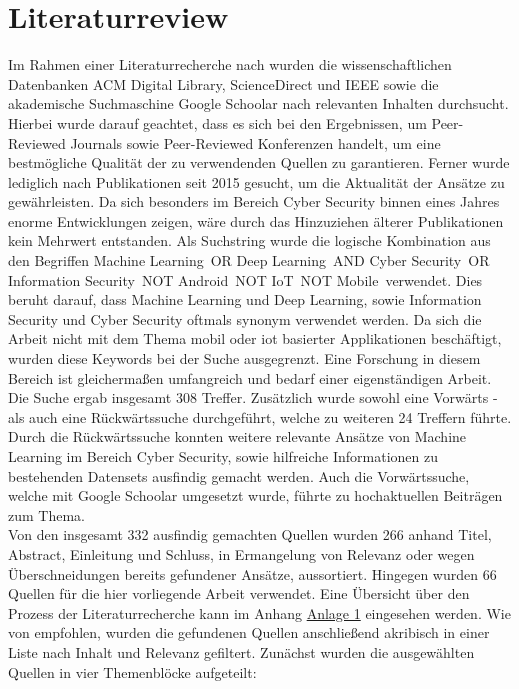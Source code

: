 \documentclass[
    12pt, %
    DIV10,
    ngerman, %
    a4paper, %
    oneside, %
    titlepage, %
    parskip=half, %
    headings=normal, %
    listof=totoc, %
    bibliography=totoc, %
    index=totoc, %
    captions=tableheading, %
    final %
]{scrreprt}
\begin{document}
\section{Literaturreview}
\label{sec:lr}
Im Rahmen einer Literaturrecherche nach \textcite{Webster2002} wurden die wissenschaftlichen Datenbanken ACM Digital Library, ScienceDirect und IEEE sowie die akademische Suchmaschine Google Schoolar nach relevanten Inhalten durchsucht. Hierbei wurde darauf geachtet, dass es sich bei den Ergebnissen, um Peer-Reviewed Journals sowie Peer-Reviewed Konferenzen handelt, um eine bestmögliche Qualität der zu verwendenden Quellen zu garantieren. Ferner wurde lediglich nach Publikationen seit 2015 gesucht, um die Aktualität der Ansätze zu gewährleisten. Da sich besonders im Bereich Cyber Security binnen eines Jahres enorme Entwicklungen zeigen, wäre durch das Hinzuziehen älterer Publikationen kein Mehrwert entstanden. Als Suchstring wurde die logische Kombination aus den Begriffen \glqq Machine Learning\grqq\ OR \glqq Deep Learning\grqq\ AND \glqq Cyber Security\grqq\ OR \glqq Information Security\grqq\ NOT \glqq Android\grqq\ NOT \glqq IoT\grqq\ NOT \glqq Mobile\grqq\ verwendet. Dies beruht darauf, dass Machine Learning und Deep Learning, sowie Information Security und Cyber Security oftmals synonym verwendet werden. Da sich die Arbeit nicht mit dem Thema mobil oder \ac{iot} basierter Applikationen beschäftigt, wurden diese Keywords bei der Suche ausgegrenzt. Eine Forschung in diesem Bereich ist gleicherma{\ss}en umfangreich und bedarf einer eigenständigen Arbeit.\\
Die Suche ergab insgesamt 308 Treffer. Zusätzlich wurde sowohl eine Vorwärts - als auch eine Rückwärtssuche durchgeführt, welche zu weiteren 24 Treffern führte. Durch die Rückwärtssuche konnten weitere relevante Ansätze von Machine Learning im Bereich Cyber Security, sowie hilfreiche Informationen zu bestehenden Datensets ausfindig gemacht werden. Auch die Vorwärtssuche, welche mit Google Schoolar umgesetzt wurde, führte zu hochaktuellen Beiträgen zum Thema.\\
Von den insgesamt 332 ausfindig gemachten Quellen wurden 266 anhand Titel, Abstract, Einleitung und Schluss, in Ermangelung von Relevanz oder wegen Überschneidungen bereits gefundener Ansätze, aussortiert. Hingegen wurden 66 Quellen für die hier vorliegende Arbeit verwendet. Eine Übersicht über den Prozess der Literaturrecherche kann im Anhang \hyperref[rm]{Anlage 1} eingesehen werden. Wie von \textcite{Webster2002} empfohlen, wurden die gefundenen Quellen anschlie{\ss}end akribisch in einer Liste nach Inhalt und Relevanz gefiltert. Zunächst wurden die ausgewählten Quellen in vier Themenblöcke aufgeteilt:
\end{document}
